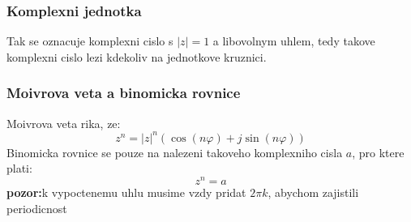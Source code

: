 \subsubsection{Komplexni jednotka}
Tak se oznacuje komplexni cislo s $|z|=1$ a libovolnym uhlem, tedy takove komplexni cislo lezi kdekoliv na jednotkove kruznici.

\subsubsection*{Moivrova veta a binomicka rovnice}
Moivrova veta rika, ze:
\begin{equation}
\label{eq:moivrova}
z^n = |z|^n (\operatorname{cos}(n\varphi)+j\operatorname{sin}(n\varphi))
\end{equation}
Binomicka rovnice se pouze na nalezeni takoveho komplexniho cisla $a$, pro ktere plati:
\begin{equation}
\label{eq:binomicka}
z^n = a
\end{equation}
\textbf{pozor:}k vypoctenemu uhlu musime vzdy pridat $2\pi k$, abychom zajistili periodicnost

